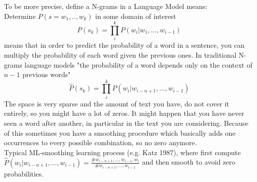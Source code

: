 To be more precise, define a N-grams in a Language Model means: \\
Determine $P(s=w_1,..,w_k)$ in some domain of interest
$$
P\left(s_{k}\right)=\prod_{i}^{k} P\left(w_{i} | w_{1}, \dots, w_{i-1}\right)
$$
means that in order to predict the probability of a word in a sentence, you can multiply the probability of each word given the previous ones. 
In traditional N-grams language models "the probability of a word depends only on the context of $n-1$ previous words"
$$
\widehat{P}\left(s_{k}\right)=\prod_{i}^{k} P\left(w_{i} | w_{i-n+1}, \dots, w_{i-1}\right)
$$
The space is very sparse and the amount of text you have, do not cover it entirely, so you might have a lot of zeros. It might happen that you have never seen a word after another, in particular in the text you are considering. Because of this sometimes you have a smoothing procedure which basically adds one occurrences to every possible combination, so no zero anymore. \\
Typical ML-smoothing learning process (e.g. Katz 1987), where first compute \\
$
\widehat{P}\left(w_{i} | w_{i-n+1}, \dots, w_{i-1}\right)=\frac{\# w_{i-n+1}, \dots, w_{i-1}, w_{i}}{\# w_{i-n+1}, \dots, w_{i-1}}
$
and then smooth to avoid zero probabilities. \\






